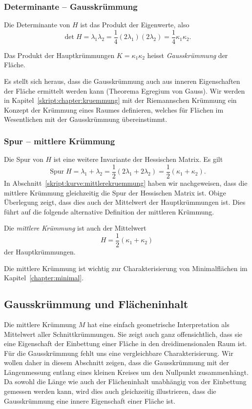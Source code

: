 \subsubsection{Determinante -- Gausskrümmung}
Die Determinante von $H$ ist das Produkt der Eigenwerte, also
\[
\det H
=
\lambda_1\lambda_2
=
\frac14 (2\lambda_1) (2\lambda_2)
=
\frac14 \kappa_1\kappa_2.
\]
\begin{definition}
\label{skript:definition:gausskruemmung}
Das Produkt der Hauptkrümmungen $K=\kappa_1\kappa_2$
heisst {\em Gausskrümmung} der Fläche.
\end{definition}
Es stellt sich heraus, dass die Gausskrümmung auch aus inneren Eigenschaften
der Fläche ermittelt werden kann
(Theorema Egregium von Gauss).
Wir werden in Kapitel~\ref{skript:chapter:kruemmung} 
mit der Riemannschen Krümmung ein Konzept der Krümmung eines Raumes
definieren, welches für Flächen im Wesentlichen mit der Gausskrümmung
übereinstimmt.

\subsubsection{Spur -- mittlere Krümmung}
Die Spur von $H$ ist eine weitere Invariante der Hessischen Matrix.
Es gilt
\[
\operatorname{Spur} H
=
\lambda_1+\lambda_2
=
\frac12(2\lambda_1+2\lambda_2)
=
\frac12(\kappa_1+\kappa_2).
\]
In Abschnitt~\ref{skript:kurve:mittlerekruemmung} haben wir nachgeweisen,
dass die mittlere Krümmung gleichzeitig die Spur der Hessischen Matrix ist.
Obige Überlegung zeigt, dass dies auch der Mittelwert der Hauptkrümmungen ist.
Dies führt auf die folgende alternative Definition der mittleren Krümmung.

\begin{definition}
\label{skript:definition:mittlerekruemmung2}
Die {\em mittlere Krümmung} ist auch der Mittelwert
\[
H=\frac12(\kappa_1+\kappa_2)
\]
der Hauptkrümmungen.
\end{definition}
Die mittlere Krümmung ist wichtig zur Charakterisierung von Minimalflächen
im Kapitel~\ref{chapter:minimal}.

\subsection{Gausskrümmung und Flächeninhalt%
\label{skript:kurven:gaussflaeche}}
Die mittlere Krümmung $M$ hat eine einfach geometrische Interpretation
als Mittelwert aller Schnittkrümmungen.
Sie zeigt auch ganz offensichtlich, dass sie eine Eigenschaft der Einbettung
einer Fläche in den dreidimensionalen Raum ist.
Für die Gausskrümmung fehlt uns eine vergleichbare Charakterisierung.
Wir wollen daher in diesem Abschnitt zeigen, dass die Gausskrümmung
mit der Längenmessung entlang eines kleinen Kreises um den Nullpunkt
zusammenhängt.
Da sowohl die Länge wie auch der Flächeninhalt unabhängig von der
Einbettung gemessen werden kann,
wird dies auch gleichzeitig illustrieren, dass die Gausskrümmung eine
innere Eigenschaft einer Fläche ist.

